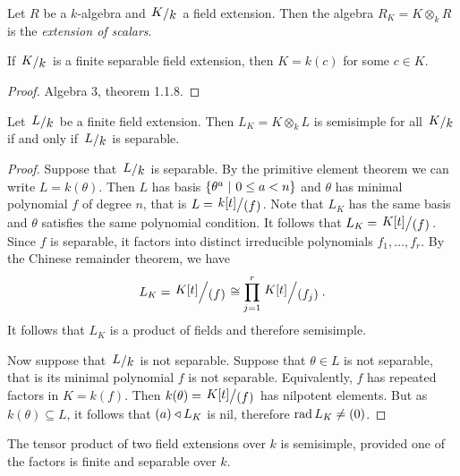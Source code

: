 \begin{definicija}
Let $R$ be a $k$-algebra and $\kvoc{K}{k}$ a field extension. Then
the algebra $R_K = K \otimes_k R$ is the
\emph{extension of scalars}.
\end{definicija}

\begin{izrek}
If $\kvoc{K}{k}$ is a finite separable field extension, then
$K = k(c)$ for some $c \in K$.
\end{izrek}

\begin{proof}
Algebra 3, theorem 1.1.8.
\end{proof}

\begin{izrek}
Let $\kvoc{L}{k}$ be a finite field extension. Then
$L_K = K \otimes_k L$ is semisimple for all $\kvoc{K}{k}$ if and
only if $\kvoc{L}{k}$ is separable.
\end{izrek}


\begin{proof}
Suppose that $\kvoc{L}{k}$ is separable. By the primitive element
theorem we can write $L = k(\theta)$. Then $L$ has basis
$\left\{\theta^a~\middle\vert~0 \leq a < n\right\}$ and $\theta$ has minimal polynomial
$f$ of degree $n$, that is $L = \kvoc{k[t]}{(f)}$. Note that $L_K$
has the same basis and $\theta$ satisfies the same polynomial
condition. It follows that $L_K = \kvoc{K[t]}{(f)}$. Since $f$ is
separable, it factors into distinct irreducible polynomials
$f_1, \dots, f_r$. By the Chinese remainder theorem, we have
\[
L_K = \kvoc{K[t]}{(f)} \cong \prod_{j=1}^r \kvoc{K[t]}{(f_j)}.
\]
It follows that $L_K$ is a product of fields and therefore
semisimple.

Now suppose that $\kvoc{L}{k}$ is not separable. Suppose that
$\theta \in L$ is not separable, that is its minimal polynomial $f$
is not separable. Equivalently, $f$ has repeated factors in
$K = k(f)$. Then $k(\theta) = \kvoc{K[t]}{(f)}$ has nilpotent
elements. But as $k(\theta) \subseteq L$, it follows that
$(a) \triangleleft L_K$ is nil, therefore $\operatorname{rad} L_K \ne (0)$.
\end{proof}

\begin{posledica}
The tensor product of two field extensions over $k$ is semisimple,
provided one of the factors is finite and separable over $k$.
\end{posledica}

